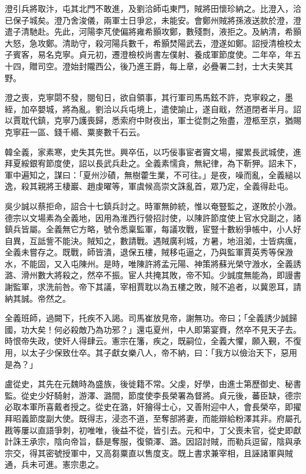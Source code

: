 \begin{pinyinscope}
 澄引兵將取汴，屯其北門不敢進，及劉洽師屯東門，賊將田懷珍納之。比澄入，洽已保子城矣。澄乃舍浚儀，兩軍士日爭忿，未能安。會鄭州賊將孫液送款於澄，澄遣子清馳赴。先此，河陽李芃使偏將雍希顥攻鄭，數殘剽，液拒之。及納清，希顥大怒，急攻鄭。清助守，殺河陽兵數千，希顥焚陽武去，澄遂如鄭。詔授清檢校太子賓客，易名克寧。貞元初，遷澄檢校尚書左僕射、養成軍節度使。二年卒，年五十四，贈司空。澄始封隴西公，後乃進王爵，每上章，必疊署二封，士大夫笑其野。



 澄之喪，克寧閟不發，閱旬日，欲自領事，其行軍司馬馬鉉不許，克寧殺之，墨絰，加卒嬰城，將為亂。劉洽以兵屯境上，遣使諭止，遂自戢，然道閉者半月。詔以賈耽代鎮，克寧乃護喪歸，悉索府中財夜出，軍士從剽之殆盡，澄柩至京，猶賜克寧莊一區、錢千緡、粟麥數千石云。



 韓全義，家素寒，史失其先世。興卒伍，以巧佞事宦者竇文場，擢累長武城使，進拜夏綏銀宥節度使，詔以長武兵赴之。全義素懦貪，無紀律，為下靳狎。詔未下，軍中遍知之，謀曰：「夏州沙磧，無樹藿生業，不可往。」是夜，噪而亂，全義縋以逸，殺其親將王棲巖、趙虔曜等，軍虞候高崇文誅亂首，眾乃定，全義得赴屯。



 吳少誠以蔡拒命，詔合十七鎮兵討之。時軍無帥統，惟以奄豎監之，遂敗於小溵。德宗以文場素為全義地，因用為淮西行營招討使，以陳許節度使上官水兌副之，諸鎮兵皆屬。全義無它方略，號令悉稟監軍，每議攻戰，宦豎十數紛爭帳中，小人好自異，互詆訾不能決。賊知之，數請戰。遇賊廣利城，方暑，地沮洳，士皆病癘，全義未嘗存之。既戰，師皆潰，退保五樓，賊移屯逼之，乃與監軍賈英秀等保溵水，不能固，又入屯陳州。是時，唯陳許將孟元陽、神策將蘇光榮守溵水，全義誘潞、滑州數大將殺之，然卒不振。宦人共掩其敗，帝不知。少誠度無能為，即謾書謝監軍，求洗前咎。帝下其議，宰相賈耽以為五樓之敗，賊不追者，以冀恩耳，請納其誠。帝然之。



 全義班師，過闕下，托疾不入謁。司馬崔放見帝，謝無功。帝曰；「全義誘少誠歸國，功大矣！何必殺敵乃為功邪？」還屯夏州，中人即第宴賚，然卒不見天子去。時恨帝失政，使奸人得肆云。憲宗在籓，疾之，既嗣位，全義大懼，願入覲，不復用，以太子少保致仕卒。其子獻女樂八人，帝不納，曰：「我方以儉治天下，惡用是為？」



 盧從史，其先在元魏時為盛族，後徙籍不常。父虔，好學，由進士第歷御史、秘書監。從史少好騎射，游澤、潞間，節度使李長榮署為督將。貞元後，蕃臣缺，德宗必取本軍所喜戴者授之。從史在潞，奸獪得士心，又善附迎中人，會長榮卒，即擢拜昭義節度副大使。既得志，浸恣不道，至奪部將妻，而能辯給粉澤其非。府屬孔戡等屢以直語爭刺，初唯唯，後益不從，皆引去。元和中，丁父喪未官，從史即獻計誅王承宗，陰向帝旨，繇是奪服，復領澤、潞。因詔討賊，而勒兵逗留，陰與承宗交，得其密號授軍中，又高芻粟直以售度支。既上書求兼宰相，且誣諸軍與賊通，兵未可進。憲宗患之。




\end{pinyinscope}
